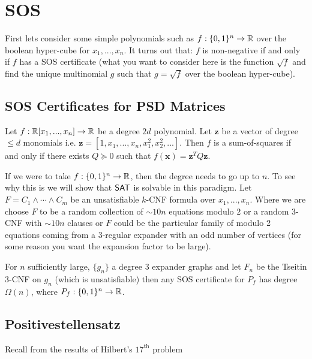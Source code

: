 



\section{SOS}
First lets consider some simple polynomials such as $f: \{0,1\}^n \rightarrow \mathbb{R}$ over the boolean hyper-cube for $x_1, ..., x_n$. It turns out that: $f$ is non-negative if and only if $f$ has a SOS certificate (what you want to consider here is the function $\sqrt{f}$ and find the unique multinomial $g$ such that $g = \sqrt{f}$ over the boolean hyper-cube). 

\subsection{SOS Certificates for PSD Matrices}
\begin{lemma}
Let $f: \mathbb{R}[x_1, ..., x_n] \rightarrow \mathbb{R}$ be a degree $2d$ polynomial. Let $\mathbf{z}$ be a vector of degree $\leq d$ monomials i.e. $\mathbf{z} = [1, x_1, ..., x_n, x_1^2, x_2^2, ...]$. Then $f$ is a sum-of-squares if and only if there exists $Q \succeq 0$ such that $f(\mathbf{x}) = \mathbf{z}^TQ\mathbf{z}$. 	 
\end{lemma}

If we were to take $f: \{0,1\}^n \rightarrow \mathbb{R}$, then the degree needs to go up to $n$. To see why this is we will show that $\mathsf{SAT}$ is solvable in this paradigm. Let $F = C_1 \land \cdots \land C_m$ be an unsatisfiable $k$-CNF formula over $x_1, ..., x_n$. Where we are choose $F$ to be a random collection of $\sim 10n$ equations modulo $2$ or a random $3$-CNF with $\sim 10n$ clauses or $F$ could be the particular family of modulo 2 equations coming from a 3-regular expander with an odd number of vertices (for some reason you want the expansion factor to be large).

\begin{theorem}
For $n$ sufficiently large, $\{g_n\}$ a degree $3$ expander graphs and let $F_n$ be the Tseitin $3$-CNF on $g_n$ (which is unsatisfiable) then any SOS certificate for $P_f$ has degree $\Omega(n)$, where $P_f: \{0,1\}^n \rightarrow \mathbb{R}$. 
\end{theorem} 

\subsection{Positivestellensatz}
Recall from the results of Hilbert's $17^{\text{th}}$ problem 


